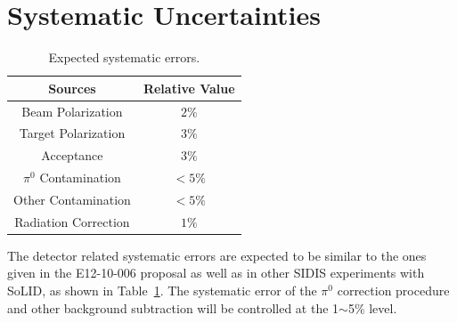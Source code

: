 \section{Systematic Uncertainties}
\begin{table}[!htp]
\centering
\begin{tabular}{|c|c|}
\hline
{\bf Sources}                  & {\bf Relative Value} \\\hline
Beam Polarization              & $2\%$ \\\hline 
Target Polarization            & $3\%$ \\\hline 
Acceptance                     & $3\%$ \\\hline
$\pi^{0}$ Contamination        & $<5\%$  \\\hline
Other Contamination            & $<5\%$ \\\hline
Radiation Correction           & $1\%$ \\\hline
\end{tabular}
\caption{\footnotesize{Expected systematic errors.}}\label{table:det_sys_err}
\end{table}
The detector related systematic errors are expected to be similar to the ones
given in the E12-10-006 proposal as well as in other SIDIS experiments with
SoLID, as shown in Table~\ref{table:det_sys_err}. The systematic error of the
$\pi^{0}$ correction procedure and other background subtraction will be
controlled at the 1$\sim$5\% level. 
